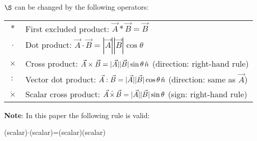 \documentclass[10pt]{article}
\begin{document}
\vspace{+0.90em}
\par \noindent ${\S}$ can be changed by the following operators:
\vspace{+0.90em}
\par\hspace{-1.20em}\begin{tabular}{cl}
\vspace{+0.90em}
\par $\ast$ & First excluded product: $\vec{A} \ast \vec{B} = \vec{B}$ \\
\vspace{+1.20em}
\par $\cdot$ & Dot product: $\vec{A} \cdot \vec{B} = |\vec{A}| |\vec{B}| \cos \theta$ \\
\vspace{+1.20em}
\par $\times$ & Cross product: $\vec{A} \times \vec{B} = |\vec{A}| |\vec{B}| \sin \theta \hspace{+0.12em} \hat{n}$ \hspace{+0.12em} (direction: right-hand rule) \\
\vspace{+1.20em}
\par $:$ & Vector dot product: $\vec{A} : \vec{B} = |\vec{A}| |\vec{B}| \cos \theta \hspace{+0.12em} \hat{n}$ \hspace{+0.12em} (direction: same as $\vec{A}$) \\
\vspace{+1.20em}
\par $\dot{\times}$ & Scalar cross product: $\vec{A} \hspace{+0.12em}\dot{\times}\hspace{+0.12em} \vec{B} = |\vec{A}| |\vec{B}| \sin \theta$ \hspace{+0.12em} (sign: right-hand rule)
\end{tabular}
\vspace{-0.12em}
\par \noindent \textbf{Note}: In this paper the following rule is valid:
\vspace{+0.90em}
\par \noindent (scalar)\hspace{+0.09em}$\cdot$\hspace{+0.09em}(scalar)\hspace{+0.27em}=\hspace{+0.27em}(scalar)\hspace{+0.27em}(scalar)
\end{document}
